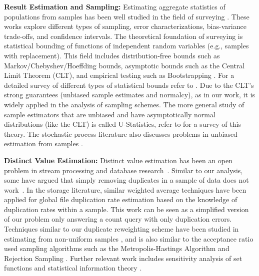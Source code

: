 \vspace{.5em}

{\noindent \bf Result Estimation and Sampling:}
Estimating aggregate statistics of populations from samples has been well studied in the field of surveying \cite{weisberg2009total,valliant2000finite, hansen1987some, barnett1991sample, sarndal2003model, kalton1983introduction}.
These works explore different types of sampling, error characterizations, bias-variance trade-offs, and confidence intervals.
The theoretical foundation of surveying is statistical bounding of functions of independent random variables (e.g., samples with replacement).
This field includes distribution-free bounds such as Markov/Chebyshev/Hoeffding bounds, asymptotic bounds such as the Central Limit Theorem (CLT), and empirical testing such as Bootstrapping \cite{hinkley1988bootstrap}.
For a detailed survey of different types of statistical bounds refer to \cite{hahn2011statistical}.
Due to the CLT's strong guarantees (unbiased sample estimates and normalcy), as in our work, it is widely applied in the analysis of sampling schemes.
The more general study of sample estimators that are unbiased and have asymptotically normal distributions (like the CLT) is called U-Statistics, refer to \cite{lee1990u} for a survey of this theory.
The stochastic process literature also discusses problems in unbiased estimation from samples \cite{jacod1987limit}.

\vspace{.5em}

{\noindent \bf Distinct Value Estimation:}
Distinct value estimation has been an open problem in stream processing and database research~\cite{considine2004approximate,bar2002counting,haas1995sampling,beyer2007synopses}.
Similar to our analysis, some have argued that simply removing duplicates in a sample of data does not work~\cite{charikar2000towards}.
In the storage literature, similar weighted average techniques have been applied for global file duplication rate estimation \cite{harnik2012estimation} based on the knowledge of duplication rates within a sample.
This work can be seen as a simplified version of our problem only answering a count query with only duplication errors.
Techniques similar to our duplicate reweighting scheme have been studied in estimating from non-uniform samples \cite{aldroubi2002non}, and is also similar to the acceptance ratio used sampling algorithms such as the Metropolis-Hastings Algorithm and Rejection Sampling \cite{liu1996metropolized,metropolis1953equation}.
Further relevant work includes sensitivity analysis of set functions \cite{mcdiarmid1989method, jukna2012analysis} and statistical information theory \cite{kullback1997information}. 
